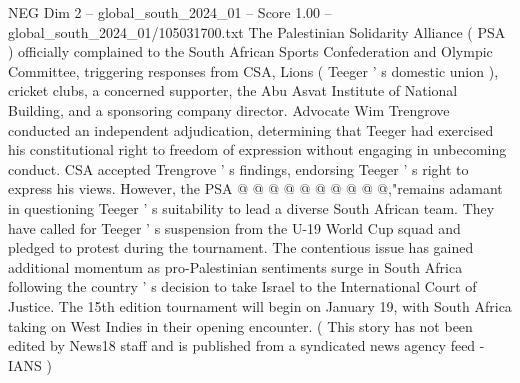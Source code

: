 \begin{textsample}{NEG Dim 2 – global\_south\_2024\_01 – Score 1.00 – global\_south\_2024\_01/105031700.txt}
The Palestinian Solidarity Alliance ( PSA ) officially complained to the South African Sports Confederation and Olympic Committee, triggering responses from CSA, Lions ( Teeger ' s domestic union ), cricket clubs, a concerned supporter, the Abu Asvat Institute of National Building, and a sponsoring company director.
Advocate Wim Trengrove conducted an independent adjudication, determining that Teeger had exercised his constitutional right to freedom of expression without engaging in unbecoming conduct.
CSA accepted Trengrove ' s findings, endorsing Teeger ' s right to express his views.
However, the PSA @ @ @ @ @ @ @ @ @ @,"remains adamant in questioning Teeger ' s suitability to lead a diverse South African team.
They have called for Teeger ' s suspension from the U-19 World Cup squad and pledged to protest during the tournament.
The contentious issue has gained additional momentum as pro-Palestinian sentiments surge in South Africa following the country ' s decision to take Israel to the International Court of Justice.
The 15th edition tournament will begin on January 19, with South Africa taking on West Indies in their opening encounter. ( This story has not been edited by News18 staff and is published from a syndicated news agency feed - IANS )

\end{textsample}
